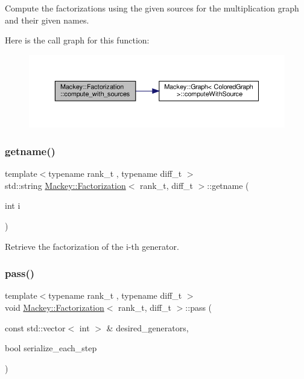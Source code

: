 Compute the factorizations using the given sources for the multiplication graph and their given names. 

Here is the call graph for this function\+:\nopagebreak
\begin{figure}[H]
\begin{center}
\leavevmode
\includegraphics[width=350pt]{classMackey_1_1Factorization_a2e135a37687fc3d69cd16a8729dd19eb_cgraph}
\end{center}
\end{figure}
\mbox{\label{classMackey_1_1Factorization_ac5088227511baaaec1f62802b75d3a9e}} 
\subsubsection{\texorpdfstring{getname()}{getname()}}
{\footnotesize\ttfamily template$<$typename rank\+\_\+t , typename diff\+\_\+t $>$ \\
std\+::string \hyperlink{classMackey_1_1Factorization}{Mackey\+::\+Factorization}$<$ rank\+\_\+t, diff\+\_\+t $>$\+::getname (\begin{DoxyParamCaption}\item[{int}]{i }\end{DoxyParamCaption})}



Retrieve the factorization of the i-\/th generator. 

\mbox{\label{classMackey_1_1Factorization_a9828268663049b5ac2668d4eb0bdd4ff}} 
\subsubsection{\texorpdfstring{pass()}{pass()}}
{\footnotesize\ttfamily template$<$typename rank\+\_\+t , typename diff\+\_\+t $>$ \\
void \hyperlink{classMackey_1_1Factorization}{Mackey\+::\+Factorization}$<$ rank\+\_\+t, diff\+\_\+t $>$\+::pass (\begin{DoxyParamCaption}\item[{const std\+::vector$<$ int $>$ \&}]{desired\+\_\+generators,  }\item[{bool}]{serialize\+\_\+each\+\_\+step }\end{DoxyParamCaption})}



